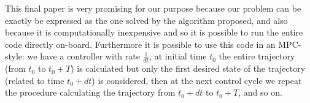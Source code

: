 This final paper is very promising for our purpose because our problem can be exactly be expressed as the one solved by the algorithm proposed, and also because it is computationally inexpensive and so it is possible to run the entire code directly on-board. Furthermore it is possible to use this code in an MPC-style: we have a controller with rate 
$\frac{1}{dt}$, at initial time $t_0$ the entire trajectory (from $t_0$ to $t_0 + T$) is calculated but only the first desired state of the trajectory (related to time $t_0+dt$) is considered, then at the next control cycle we repeat the procedure calculating the trajectory from $t_0 + dt$ to $t_0 + T$, and so on.






